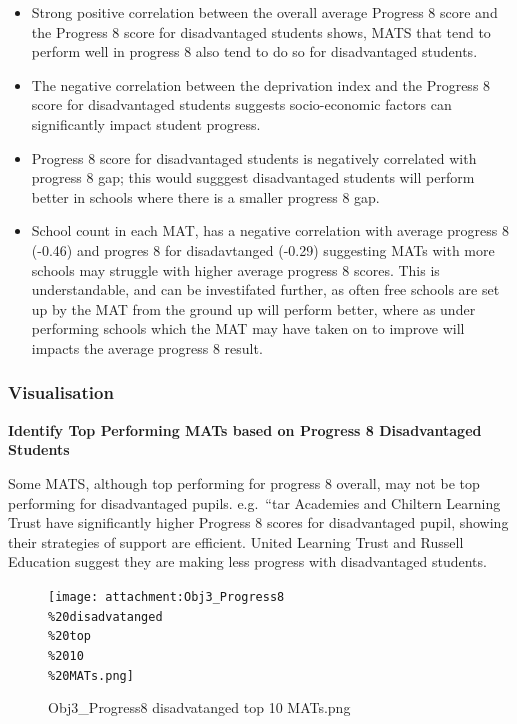 \documentclass[
  letterpaper,
  DIV=11,
  numbers=noendperiod]{scrartcl}
\begin{document}
\begin{itemize}
\item
  Strong positive correlation between the overall average Progress 8
  score and the Progress 8 score for disadvantaged students shows, MATS
  that tend to perform well in progress 8 also tend to do so for
  disadvantaged students.
\item
  The negative correlation between the deprivation index and the
  Progress 8 score for disadvantaged students suggests socio-economic
  factors can significantly impact student progress.
\item
  Progress 8 score for disadvantaged students is negatively correlated
  with progress 8 gap; this would sugggest disadvantaged students will
  perform better in schools where there is a smaller progress 8 gap.
\item
  School count in each MAT, has a negative correlation with average
  progress 8 (-0.46) and progres 8 for disadavtanged (-0.29) suggesting
  MATs with more schools may struggle with higher average progress 8
  scores. This is understandable, and can be investifated further, as
  often free schools are set up by the MAT from the ground up will
  perform better, where as under performing schools which the MAT may
  have taken on to improve will impacts the average progress 8 result.
\end{itemize}

\subsubsection{Visualisation}\label{visualisation-1}

\textbf{Identify Top Performing MATs based on Progress 8 Disadvantaged
Students}

Some MATS, although top performing for progress 8 overall, may not be
top performing for disadvantaged pupils. e.g.~``tar Academies and
Chiltern Learning Trust have significantly higher Progress 8 scores for
disadvantaged pupil, showing their strategies of support are efficient.
United Learning Trust and Russell Education suggest they are making less
progress with disadvantaged students.

\begin{figure}[H]

{\centering \texttt{[image: attachment:Obj3\_Progress8\\\%20disadvatanged\\\%20top\\\%2010\\\%20MATs.png]}

}

\caption{Obj3\_Progress8 disadvatanged top 10 MATs.png}

\end{figure}%
\end{document}
